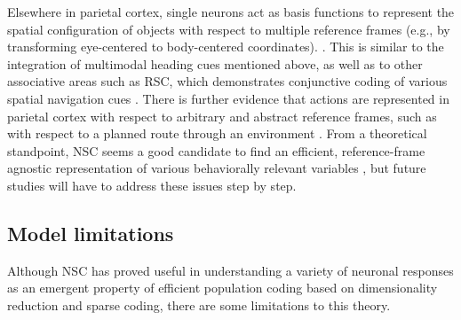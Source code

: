 Elsewhere in parietal cortex, single neurons act as basis functions 
to represent the spatial configuration of objects 
with respect to multiple reference frames
(e.g., by transforming eye-centered to body-centered coordinates).
\cite{Poggio1990,PougetSejnowski1997,PougetSnyder2000}.
This is similar to the integration of multimodal heading cues mentioned above,
as well as to other associative areas such as \ac{RSC},
which demonstrates conjunctive coding of various spatial navigation cues
\cite{AlexanderNitz2015,Rounds2018}.
There is further evidence that actions are represented in parietal cortex
with respect to arbitrary and abstract reference frames, 
such as with respect to a planned route through an environment \cite{nitz2009parietal}.
From a theoretical standpoint, \ac{NSC} seems a good candidate to find an efficient,
reference-frame agnostic representation of various behaviorally relevant variables
\cite{LouieGlimcher2012,louie2015adaptive,andersen1997multimodal,BenHamed2003},
but future studies will have to address these issues step by step.



\subsection*{Model limitations}


Although \ac{NSC} has proved useful in understanding
a variety of neuronal responses
as an emergent property of efficient population
coding based on dimensionality reduction and sparse coding,
there are some limitations to this theory.


